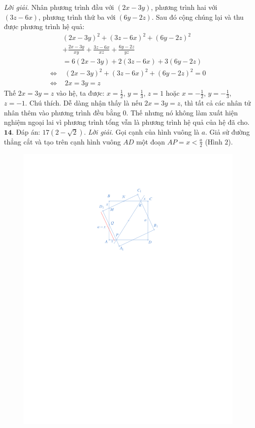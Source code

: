 \begin{multicols}{2}
	\vskip 0.1cm 
	\textit{Lời giải.} Nhân phương trình đầu với  $(2x - 3y)$, phương trình hai với $(3z-6x)$, phương trình thứ ba với $(6y-2z)$. Sau đó cộng chúng lại và thu được phương trình hệ quả:
	\begin{align*}
		&{\left( {2x - 3y} \right)^2} + {\left( {3z - 6x} \right)^2} + {\left( {6y - 2z} \right)^2} \\
		&+ \frac{{2x - 3y}}{{xy}} + \frac{{3z - 6x}}{{xz}} + \frac{{6y - 2z}}{{yz}}\\
		&= 6\left( {2x \!-\! 3y} \right) \!+\! 2\left( {3z \!-\! 6x} \right) \!+\! 3\left( {6y \!-\! 2z} \right)\\
		\Leftrightarrow &\,\,{\left( {2x \!-\! 3y} \right)^2} \!+\! {\left( {3z \!-\! 6x} \right)^2} \!+\! {\left( {6y \!-\! 2z} \right)^2} \!=\! 0\\
		\Leftrightarrow &\,\,2x = 3y = z
	\end{align*}
	Thế $2x = 3y = z$ vào hệ, ta được:  $x = \frac{1}{2}$, $y = \frac{1}{3}$, $z =1$ hoặc $x = - \frac{1}{2}$, $y = - \frac{1}{3}$,  $z = -1$.
	\vskip 0.1cm 
	Chú thích. Dễ dàng nhận thấy là nếu  $2x = 3y = z$, thì tất cả các nhân tử nhân thêm vào phương trình đều bằng $0$. Thế nhưng nó không làm xuất hiện nghiệm ngoại lai vì phương trình tổng vẫn là phương trình hệ quả của hệ đã cho.
	\vskip 0.1cm
	$\pmb{14.}$ Đáp án:  $17\left( {2 - \sqrt 2 } \right)$.
	\vskip 0.1cm 
	\textit{Lời giải.} Gọi cạnh của hình vuông là $a$. Giả sử đường thẳng cắt và tạo trên cạnh hình vuông $AD$ một đoạn $AP = x < \frac{a}{2}$  (Hình $2$).
	\begin{figure}[H]
		\vspace*{-5pt}
		\centering
		\captionsetup{labelformat= empty, justification=centering}
		\includegraphics[width= 1\linewidth]{1a.pdf}

\end{figure}
\end{multicols}

